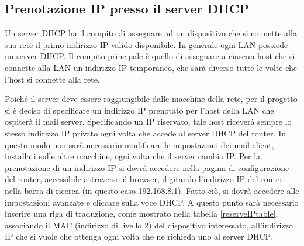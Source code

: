 \subsection{Prenotazione IP presso il server DHCP}
Un server DHCP ha il compito di assegnare ad un dispositivo che si connette alla sua rete il primo indirizzo IP 
valido disponibile. In generale ogni LAN possiede un server DHCP. 
Il compito principale è quello di assegnare a ciascun host che si connette alla LAN un indirizzo IP temporaneo, 
che sarà diverso tutte le volte che l’host si connette alla rete. 

Poiché il server deve essere raggiungibile dalle macchine della rete, 
per il progetto si è deciso di specificare un indirizzo IP prenotato per l’host della LAN che ospiterà il mail server. 
Specificando un IP riservato, tale host riceverà sempre lo stesso indirizzo IP privato ogni volta che accede al 
server DHCP del router. In questo modo non sarà necessario modificare le impostazioni dei mail client, 
installati sulle altre macchine, ogni volta che il server cambia IP.
Per la prenotazione di un indirizzo IP si dovrà accedere nella pagina di configurazione del router, 
accessibile attraverso il browser, digitando l’indirizzo IP del router nella barra di ricerca 
(in questo caso 192.168.8.1). Fatto ciò, si dovrà accedere alle impostazioni avanzate e cliccare sulla voce DHCP. 
A questo punto sarà necessario inserire una riga di traduzione, come mostrato nella tabella \ref{reserveIPtable},
associando il MAC (indirizzo di livello 2) del dispositivo interessato, all’indirizzo IP che si vuole che ottenga 
ogni volta che ne richieda uno al server DHCP.

\begin{table}[htp]
    \centering
    \caption{Tabella per l'assegnazione di un indirizzo IP riservato}\label{reserveIPtable}
    \end{table}

